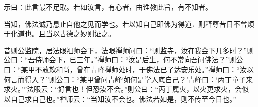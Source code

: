 示曰：此言最不足取。若如汝言，有心者，由谁教此旨，有不知者。

当知，佛法诚乃息止自他之见而学也。若以知自己即佛为得道，则释尊昔日不曾烦于化道也。且当以古德之妙则证之。

昔则公监院，居法眼祖师会下，法眼禅师问曰：“则监寺，汝在我会下几多时？”则公曰：“吾侍师会下，已三年。”禅师曰：“汝是后生，何不常向吾问佛法？”则公曰：“某甲不敢欺和尚，曾在青峰禅师处时，于佛法已了达安乐处。”禅师曰：“汝以何言而得入？”则公曰：“某甲曾问青峰‘如何是学人底自己？’青峰曰：‘丙丁童子来求火。’”法眼云：“好言也！但恐汝不会。”则公曰：“丙丁属火，以火更求火，会似以自己求自己也。”禅师云：“当知汝不会也。佛法若如是，则不传至今日也。”

